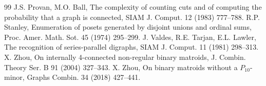 \documentclass[10pt,a4paper]{amsart}
\begin{document}
\begin{thebibliography}{99}
 J.S. Provan, M.O. Ball, The complexity of counting cuts and of computing the probability that a graph is connected, SIAM J. Comput. 12 (1983) 777--788.
 R.P. Stanley, Enumeration of posets generated by disjoint unions and ordinal sums, Proc. Amer. Math. Sot. 45 (1974) 295--299.
 J. Valdes, R.E. Tarjan, E.L. Lawler, The recognition of series-parallel digraphs, SIAM J. Comput. 11 (1981) 298--313.
 X. Zhou, On internally 4-connected non-regular binary matroids, J. Combin. Theory Ser. B 91 (2004) 327--343.
 X. Zhou, On binary matroids without a $P_{10}$-minor, Graphs Combin. 34 (2018) 427--441.
\end{thebibliography}
\end{document}
